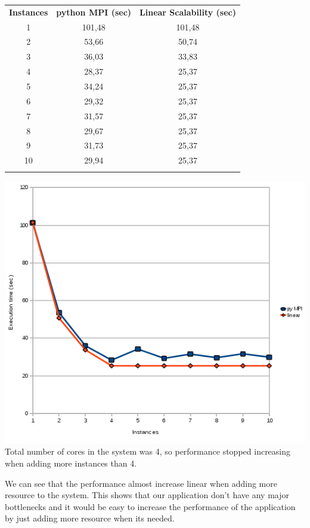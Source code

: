 \documentclass{article}
\begin{document}
\begin{tabular}{c c c}
  \rowcolor[gray]{0.5}
  {\bf Instances} & {\bf python MPI (sec)} & {\bf Linear Scalability (sec)} \\
  1 & 101,48 & 101,48 \\
  2 & 53,66  & 50,74  \\
  3 & 36,03  & 33,83  \\
  4 & 28,37  & 25,37  \\
  5 & 34,24  & 25,37  \\
  6 & 29,32  & 25,37  \\
  7 & 31,57  & 25,37  \\
  8 & 29,67  & 25,37  \\
  9 & 31,73  & 25,37  \\
 10 & 29,94  & 25,37  \\
\rowcolor[gray]{0.5}
\end{tabular}

\includegraphics[width=\textwidth]{img/scalabilty-pympi.png}
\\\small{ Total number of cores in the system was 4, so performance stopped
increasing when adding more instances than 4. }

We can see that the performance almost increase linear when adding more
resource to the system. This shows that our application don't have any
major bottlenecks and it would be easy to increase the performance
of the application by just adding more resource when its needed.
\end{document}
